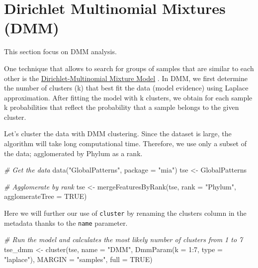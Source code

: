 \documentclass[
]{book}
\newenvironment{Shaded}{\begin{snugshade}}{\end{snugshade}}
\newcommand{\AttributeTok}[1]{\textcolor[rgb]{0.77,0.63,0.00}{#1}}
\newcommand{\CommentTok}[1]{\textcolor[rgb]{0.56,0.35,0.01}{\textit{#1}}}
\newcommand{\ConstantTok}[1]{\textcolor[rgb]{0.00,0.00,0.00}{#1}}
\newcommand{\DecValTok}[1]{\textcolor[rgb]{0.00,0.00,0.81}{#1}}
\newcommand{\FunctionTok}[1]{\textcolor[rgb]{0.00,0.00,0.00}{#1}}
\newcommand{\NormalTok}[1]{#1}
\newcommand{\OtherTok}[1]{\textcolor[rgb]{0.56,0.35,0.01}{#1}}
\newcommand{\SpecialCharTok}[1]{\textcolor[rgb]{0.00,0.00,0.00}{#1}}
\newcommand{\StringTok}[1]{\textcolor[rgb]{0.31,0.60,0.02}{#1}}
\begin{document}
\hypertarget{dirichlet-multinomial-mixtures-dmm}{%
\section{Dirichlet Multinomial Mixtures (DMM)}\label{dirichlet-multinomial-mixtures-dmm}}

This section focus on DMM analysis.

One technique that allows to search for groups of samples that are
similar to each other is the \href{https://journals.plos.org/plosone/article?id=10.1371/journal.pone.0030126}{Dirichlet-Multinomial Mixture
Model}
. In DMM, we first determine the number of clusters (k) that best fit the
data (model evidence) using Laplace approximation. After fitting the
model with k clusters, we obtain for each sample k probabilities that
reflect the probability that a sample belongs to the given cluster.

Let's cluster the data with DMM clustering. Since the dataset is large, the
algorithm will take long computational time. Therefore, we use only a subset
of the data; agglomerated by Phylum as a rank.

\begin{Shaded}
\begin{Highlighting}[]
\CommentTok{\# Get the data}
\FunctionTok{data}\NormalTok{(}\StringTok{"GlobalPatterns"}\NormalTok{, }\AttributeTok{package =} \StringTok{"mia"}\NormalTok{)}
\NormalTok{tse }\OtherTok{\textless{}{-}}\NormalTok{ GlobalPatterns}

\CommentTok{\# Agglomerate by rank}
\NormalTok{tse }\OtherTok{\textless{}{-}} \FunctionTok{mergeFeaturesByRank}\NormalTok{(tse, }\AttributeTok{rank =} \StringTok{"Phylum"}\NormalTok{, }\AttributeTok{agglomerateTree =} \ConstantTok{TRUE}\NormalTok{)}
\end{Highlighting}
\end{Shaded}

Here we will further our use of \texttt{cluster} by renaming the clusters column in
the metadata thanks to the \texttt{name} parameter.

\begin{Shaded}
\begin{Highlighting}[]
\CommentTok{\# Run the model and calculates the most likely number of clusters from 1 to 7}
\NormalTok{tse\_dmm }\OtherTok{\textless{}{-}} \FunctionTok{cluster}\NormalTok{(tse, }\AttributeTok{name =} \StringTok{"DMM"}\NormalTok{, }\FunctionTok{DmmParam}\NormalTok{(}\AttributeTok{k =} \DecValTok{1}\SpecialCharTok{:}\DecValTok{7}\NormalTok{, }\AttributeTok{type =} \StringTok{"laplace"}\NormalTok{), }
                   \AttributeTok{MARGIN =} \StringTok{"samples"}\NormalTok{, }\AttributeTok{full =} \ConstantTok{TRUE}\NormalTok{)}
\end{Highlighting}
\end{Shaded}
\end{document}
